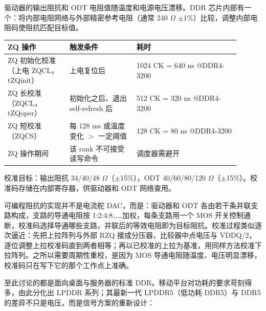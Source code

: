 

驱动器的输出阻抗和 ODT 电阻值随温度和电源电压漂移。DDR 芯片内部有一个：将内部电阻网络与外部精密参考电阻（通常 240 $\Omega$ $\pm$1\%）比较，调整内部电阻码使阻抗匹配目标值。

\begin{longtable}{L{0.24\linewidth}L{0.26\linewidth}L{0.4\linewidth}}
\toprule
ZQ 操作 & 触发条件 & 耗时 \\
\midrule
ZQ 初始化校准（上电 ZQCL，tZQinit） & 上电复位后 & 1024 CK = 640 ns @DDR4-3200 \\\tablerowrule
ZQ 长校准（ZQCL，tZQoper） & 初始化之后、退出 self-refresh 后 & 512 CK = 320 ns @DDR4-3200 \\\tablerowrule
ZQ 短校准（ZQCS） & 每 128 ms 或温度变化 $>$ 一定阈值 & 128 CK = 80 ns @DDR4-3200 \\\tablerowrule
ZQ 操作期间 & 该 rank 不可接受读写命令 & 调度器需避开 \\
\bottomrule
\end{longtable}

校准目标：输出阻抗 34/40/48 $\Omega$（$\pm$15\%），ODT 40/60/80/120 $\Omega$（$\pm$15\%）。校准码存储在内部寄存器，供驱动器和 ODT 网络查用。

可编程阻抗的实现并不是电流舵 DAC，而是：驱动器和 ODT 各由若干条并联支路构成，支路的导通电阻按 1:2:4:8……加权，每条支路用一个 MOS 开关控制通断，校准码选择导通哪些支路，并联后的等效电阻即为目标阻抗。校准过程类似逐次逼近：先把上拉阵列与外部 RZQ 接成分压器，比较器中点电压与 VDDQ/2，逐位调整上拉校准码直到两者相等；再以已校准的上拉为基准，用同样方法校准下拉阵列。之所以需要周期性重校，是因为 MOS 导通电阻随温度、电压明显漂移，校准码只在写下它的那个工作点上准确。


至此讨论的都是面向桌面与服务器的标准 DDR。移动平台对功耗的要求苛刻得多，由此分化出 LPDDR 系列；其最新一代 LPDDR5（低功耗 DDR5）与 DDR5 的差异不只是电压，而是信号方案的重新设计：

